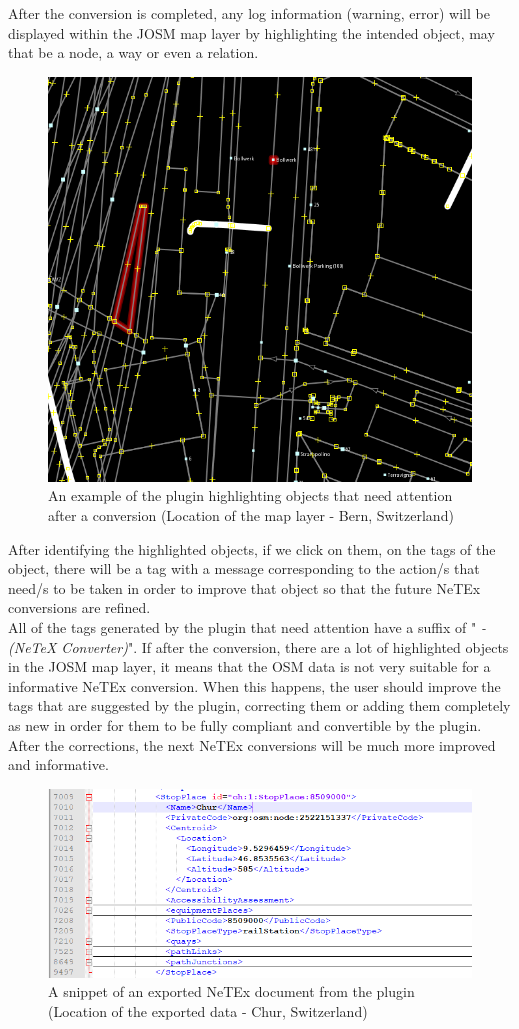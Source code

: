 After the conversion is completed, any log information (warning, error) will be displayed within the JOSM map layer by highlighting the intended object, may that be a node, a way or even a relation.
\begin{figure}[H]
	\includegraphics[width=\linewidth]{./Images/ArchitectureDesign/highlight_example.png}
	\caption{An example of the plugin highlighting objects that need attention after a conversion (Location of the map layer - Bern, Switzerland)}
\end{figure}
After identifying the highlighted objects, if we click on them, on the tags of the object, there will be a tag with a message corresponding to the action/s that need/s to be taken in order to improve that object so that the future NeTEx conversions are refined.\\
All of the tags generated by the plugin that need attention have a suffix of "\textit{ - (NeTeX Converter)}".
If after the conversion, there are a lot of highlighted objects in the JOSM map layer, it means that the OSM data is not very suitable for a informative NeTEx conversion. When this happens, the user should improve the tags that are suggested by the plugin, correcting them or adding them completely as new in order for them to be fully compliant and convertible by the plugin. After the corrections, the next NeTEx conversions will be much more improved and informative.
\begin{figure}[H]
	\includegraphics[width=\linewidth]{./Images/ArchitectureDesign/netex_doc_example.png}
	\caption{A snippet of an exported NeTEx document from the plugin (Location of the exported data - Chur, Switzerland)}
\end{figure}


